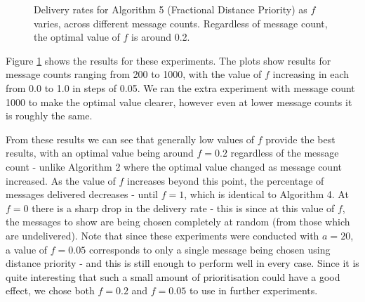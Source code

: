 \documentclass[bsc,frontabs,twoside,singlespacing,parskip,deptreport]{infthesis}     %
\begin{document}
\begin{figure}
\centering
{}
\caption{Delivery rates for Algorithm 5 (Fractional Distance Priority) as $f$ varies, across different message counts. Regardless of message count, the optimal value of $f$ is around 0.2.}
\label{fig:distance_priority_fraction}
\end{figure}

Figure \ref{fig:distance_priority_fraction} shows the results for these experiments. The plots show results for message counts ranging from 200 to 1000, with the value of $f$ increasing in each from 0.0 to 1.0 in steps of 0.05. We ran the extra experiment with message count 1000 to make the optimal value clearer, however even at lower message counts it is roughly the same.

From these results we can see that generally low values of $f$ provide the best results, with an optimal value being around $f=0.2$ regardless of the message count - unlike Algorithm 2 where the optimal value changed as message count increased. As the value of $f$ increases beyond this point, the percentage of messages delivered decreases - until $f=1$, which is identical to Algorithm 4. At $f=0$ there is a sharp drop in the delivery rate - this is since at this value of $f$, the messages to show are being chosen completely at random (from those which are undelivered). Note that since these experiments were conducted with $a=20$, a value of $f=0.05$ corresponds to only a single message being chosen using distance priority - and this is still enough to perform well in every case. Since it is quite interesting that such a small amount of prioritisation could have a good effect, we chose both $f=0.2$ and $f=0.05$ to use in further experiments.
\end{document}
